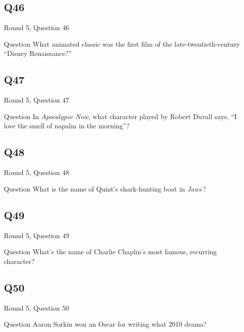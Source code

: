 \documentclass[11pt]{beamer}
\begin{document}
\subsection*{Q46}
\begin{frame}[t]{Round 5, Question 46}
\vspace{2em}
\begin{block}{Question}
What animated classic was the first film of the late-twentieth-century ``Disney Renaissance?''
\end{block}
\end{frame}
    

\subsection*{Q47}
\begin{frame}[t]{Round 5, Question 47}
\vspace{2em}
\begin{block}{Question}
In \emph{Apocalypse Now}, what character played by Robert Duvall says, ``I love the smell of napalm in the morning''?
\end{block}
\end{frame}
    

\subsection*{Q48}
\begin{frame}[t]{Round 5, Question 48}
\vspace{2em}
\begin{block}{Question}
What is the name of Quint's shark-hunting boat in \emph{Jaws}\,?
\end{block}
\end{frame}
    

\subsection*{Q49}
\begin{frame}[t]{Round 5, Question 49}
\vspace{2em}
\begin{block}{Question}
What's the name of Charlie Chaplin's most famous, recurring character?
\end{block}
\end{frame}
    

\subsection*{Q50}
\begin{frame}[t]{Round 5, Question 50}
\vspace{2em}
\begin{block}{Question}
Aaron Sorkin won an Oscar for writing what 2010 drama?
\end{block}
\end{frame}
    
\end{document}
